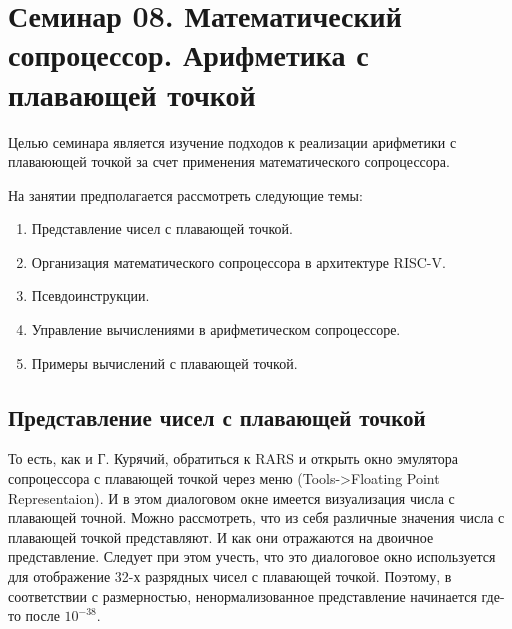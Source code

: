 \chapter[Арифметика с плавающей точкой. Начало]{Семинар 08. Математический сопроцессор. Арифметика с плавающей точкой}

Целью семинара является изучение подходов к реализации арифметики с плаваюющей точкой за счет применения математического сопроцессора.


На занятии предполагается рассмотреть следующие темы:
\begin{enumerate}
    \item Представление чисел с плавающей точкой.
    \item Организация математического сопроцессора в архитектуре RISC-V.
    \item Псевдоинструкции.
    \item Управление вычислениями в арифметическом сопроцессоре.
    \item Примеры вычислений с плавающей точкой.
\end{enumerate}

\section{Представление чисел с плавающей точкой}


То есть, как и Г. Курячий, обратиться к RARS и открыть окно эмулятора сопроцессора с плавающей точкой через меню (Tools->Floating Point Representaion). И в этом диалоговом окне имеется визуализация числа с плавающей точной. Можно рассмотреть, что из себя различные значения числа с плавающей точкой представляют. И как они отражаются на двоичное представление. Следует при этом учесть, что это диалоговое окно используется для отображение 32-х разрядных чисел с плавающей точкой. Поэтому, в соответствии с размерностью, ненормализованное представление начинается где-то после $10^{-38}$.

